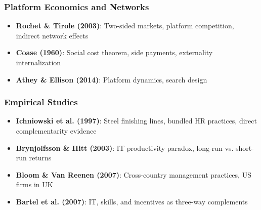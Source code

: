 \subsubsection{Platform Economics and Networks}

\begin{itemize}
    \item \textbf{Rochet \& Tirole (2003)}: Two-sided markets, platform competition, 
    indirect network effects
    \item \textbf{Coase (1960)}: Social cost theorem, side payments, externality 
    internalization
    \item \textbf{Athey \& Ellison (2014)}: Platform dynamics, search design
\end{itemize}

\subsubsection{Empirical Studies}

\begin{itemize}
    \item \textbf{Ichniowski et al. (1997)}: Steel finishing lines, bundled HR 
    practices, direct complementarity evidence
    \item \textbf{Brynjolfsson \& Hitt (2003)}: IT productivity paradox, long-run 
    vs. short-run returns
    \item \textbf{Bloom \& Van Reenen (2007)}: Cross-country management practices, 
    US firms in UK
    \item \textbf{Bartel et al. (2007)}: IT, skills, and incentives as three-way 
    complements
\end{itemize}



% 
% 


